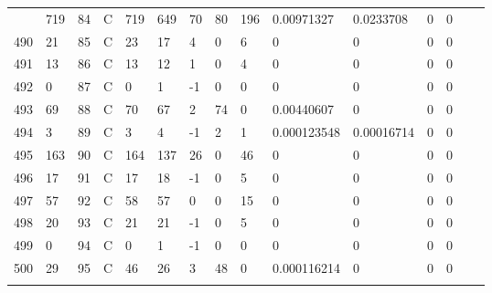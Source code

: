 \begin{longtable}{lllllllllllllll}
\begin{comment}
	489 & 719               & 84  & C   & 719               & 649               & 70                & 80   & 196        & 0.00971327     & 0.0233708      & 0             & 0            \\
	490 & 21                & 85  & C   & 23                & 17                & 4                 & 0    & 6          & 0              & 0              & 0             & 0            \\
	491 & 13                & 86  & C   & 13                & 12                & 1                 & 0    & 4          & 0              & 0              & 0             & 0            \\
	492 & 0                 & 87  & C   & 0                 & 1                 & -1                & 0    & 0          & 0              & 0              & 0             & 0            \\
	493 & 69                & 88  & C   & 70                & 67                & 2                 & 74   & 0          & 0.00440607     & 0              & 0             & 0            \\
	494 & 3                 & 89  & C   & 3                 & 4                 & -1                & 2    & 1          & 0.000123548    & 0.00016714     & 0             & 0            \\
	495 & 163               & 90  & C   & 164               & 137               & 26                & 0    & 46         & 0              & 0              & 0             & 0            \\
	496 & 17                & 91  & C   & 17                & 18                & -1                & 0    & 5          & 0              & 0              & 0             & 0            \\
	497 & 57                & 92  & C   & 58                & 57                & 0                 & 0    & 15         & 0              & 0              & 0             & 0            \\
	498 & 20                & 93  & C   & 21                & 21                & -1                & 0    & 5          & 0              & 0              & 0             & 0            \\
	499 & 0                 & 94  & C   & 0                 & 1                 & -1                & 0    & 0          & 0              & 0              & 0             & 0            \\
	500 & 29                & 95  & C   & 46                & 26                & 3                 & 48   & 0          & 0.000116214    & 0              & 0             & 0            \\

\end{comment}
\end{longtable}

